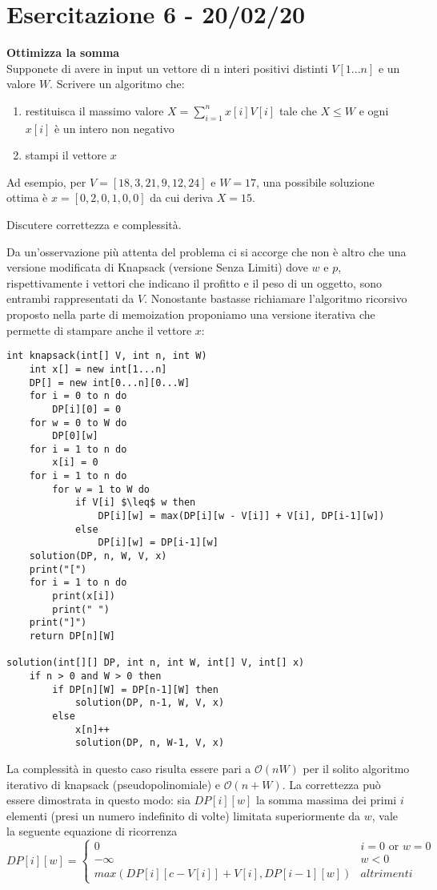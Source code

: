 \documentclass[../cheatSheetAlgoritmi.tex]{subfiles}
\begin{document}
\section{Esercitazione 6 - 20/02/20}
\textbf{Ottimizza la somma}\\
Supponete di avere in input un vettore di n interi positivi distinti $V[1. . . n]$ e un valore $W$. Scrivere un algoritmo che:
\begin{enumerate}
	\item restituisca il massimo valore $X =  \sum_{i = 1}^{n} x[i] V[i]$ tale che $X \leq W$ e ogni $x[i]$ è un intero non negativo
	\item stampi il vettore $x$
\end{enumerate}

Ad esempio, per $V = [18,3,21,9,12,24]$ e $W = 17$, una possibile soluzione ottima è 
\break 
$x = [0,2,0,1,0,0]$ da cui deriva $X= 15$.

Discutere correttezza e complessità.

\bigskip
Da un'osservazione più attenta del problema ci si accorge che non è altro che una versione modificata di Knapsack (versione Senza Limiti) dove $w$ e $p$, rispettivamente i vettori che indicano il profitto e il peso di un oggetto, sono entrambi rappresentati da $V$. Nonostante bastasse richiamare l'algoritmo ricorsivo proposto nella parte di memoization proponiamo una versione iterativa che permette di stampare anche il vettore $x$:


\begin{lstlisting}[caption=Ottimizza la Somma]
int knapsack(int[] V, int n, int W)
	int x[] = new int[1...n]
	DP[] = new int[0...n][0...W]
	for i = 0 to n do
		DP[i][0] = 0
	for w = 0 to W do
		DP[0][w]
	for i = 1 to n do
		x[i] = 0
	for i = 1 to n do
		for w = 1 to W do
			if V[i] $\leq$ w then
				DP[i][w] = max(DP[i][w - V[i]] + V[i], DP[i-1][w])
			else
				DP[i][w] = DP[i-1][w]
	solution(DP, n, W, V, x)
	print("[")
	for i = 1 to n do
		print(x[i])
		print(" ")
	print("]")
	return DP[n][W]
	
solution(int[][] DP, int n, int W, int[] V, int[] x)
	if n > 0 and W > 0 then
		if DP[n][W] = DP[n-1][W] then
			solution(DP, n-1, W, V, x)
		else
			x[n]++
			solution(DP, n, W-1, V, x)
\end{lstlisting}
La complessità in questo caso risulta essere pari a $\mathcal{O}(nW)$ per il solito algoritmo iterativo di knapsack (pseudopolinomiale) e $\mathcal{O}(n + W)$. La correttezza può essere dimostrata in questo modo: sia $DP[i][w]$ la somma massima dei primi $i$ elementi (presi un numero indefinito di volte) limitata superiormente da $w$, vale la seguente equazione di ricorrenza
\begin{equation*}
  	DP[i][w] =\begin{cases}
    	0 & \text{$i = 0$  or  $w = 0$}\\
    	-\infty & \text{$w < 0$}\\
    	max(DP[i][c-V[i]]+V[i], DP[i-1][w]) & \text{$altrimenti$}
  	\end{cases}
\end{equation*}

\bigskip
\end{document}
